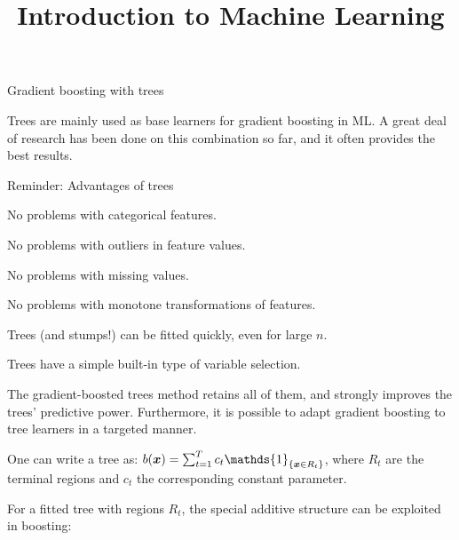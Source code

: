  






\newcommand{\titlefigure}{figure_man/gbm_anim_31.png}
\newcommand{\learninggoals}{
  \item \textcolor{blue}{XXX}
  \item \textcolor{blue}{XXX}
}

\title{Introduction to Machine Learning}
\date{}






\begin{vbframe}{Gradient boosting with trees}

Trees are mainly used as base learners for gradient boosting in ML.
A great deal of research has been done on this combination so far, and it often provides the best results.

\begin{blocki}{Reminder: Advantages of trees}
\item No problems with categorical features.
\item No problems with outliers in feature values.
\item No problems with missing values.
\item No problems with monotone transformations of features.
\item Trees (and stumps!) can be fitted quickly, even for large $n$.
\item Trees have a simple built-in type of variable selection.
\end{blocki}
The gradient-boosted trees method retains all of them, and strongly improves the trees' predictive power.
Furthermore, it is possible to adapt gradient boosting to tree learners in a targeted manner.

\framebreak

One can write a tree as: $ b(\xv) = \sum_{t=1}^{T} c_t \mathds{1}_{\{\xv \in R_t\}} $,
where $R_t$ are the terminal regions and $c_t$ the corresponding constant parameter.

\vspace*{0.2cm}

For a fitted tree with regions $R_t$, the special additive structure can be exploited in boosting:  %


\end{vbframe}
